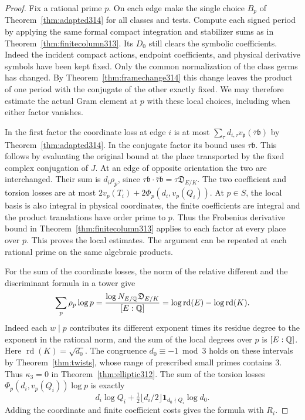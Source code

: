 \documentclass[a4paper,11pt]{article}
\theoremstyle{definition}
\theoremstyle{remark}
\numberwithin{equation}{section}
\begin{document}
\begin{proof}
Fix a rational prime \(p\). On each edge make the single choice
\(B_p\) of Theorem~\ref{thm:adapted314} for all classes and
tests. Compute each signed period by applying the same formal
compact integration and stabilizer sums as in
Theorem~\ref{thm:finitecolumn313}. Its \(D_0\) still clears
the symbolic coefficients. Indeed the incident compact actions,
endpoint coefficients, and physical derivative symbols have been
kept fixed. Only the common normalization of the class germs
has changed. By Theorem~\ref{thm:framechange314} this change
leaves the product of one period with the conjugate of the other
exactly fixed. We may therefore estimate the actual Gram element
at \(p\) with these local choices, including when either factor
vanishes.

In the first factor the coordinate loss at edge \(i\) is at most
\(\sum_\tau d_{i,\tau}v_{\mathfrak p}(\bar\tau\mathfrak b)\)
by Theorem~\ref{thm:adapted314}. In the conjugate factor its
bound uses \(\tau\mathfrak b\). This follows by evaluating the
original bound at the place transported by the fixed complex
conjugation of \(J\). At an edge of opposite orientation the
two are interchanged. Their sum is \(d_i\rho_p\), since
\(\tau\mathfrak b\cdot\bar\tau\mathfrak b=
\tau\mathfrak D_{E/K}\). The two coefficient and torsion losses
are at most \(2v_p(T_i)+2\Phi_p(d_i,v_p(Q_i))\).
At \(p\in S\), the local basis is also integral in physical
coordinates, the finite coefficients are integral and the
product translations have order prime to \(p\). Thus the
Frobenius derivative bound in Theorem~\ref{thm:finitecolumn313}
applies to each factor at every place over \(p\). This proves
the local estimates. The argument can be repeated at each
rational prime on the same algebraic products.

For the sum of the coordinate losses, the norm of the relative
different and the discriminant formula in a tower give
\[
 \sum_p\rho_p\log p=
 \frac{\log N_{E/\mathbb Q}\mathfrak D_{E/K}}{[E:\mathbb Q]}
       =\log\operatorname{rd}(E)-\log\operatorname{rd}(K).
\]
Indeed each \(w\mid p\) contributes its different exponent times
its residue degree to the exponent in the rational norm, and the
sum of the local degrees over \(p\) is \([E:\mathbb Q]\).
Here \(\operatorname{rd}(K)=\sqrt{d_0}\). The congruence
\(d_0\equiv-1\bmod3\) holds on these intervals by
Theorem~\ref{thm:twists}, whose range of prescribed small primes
contains \(3\). Thus \(\kappa_3=0\) in
Theorem~\ref{thm:elliptic312}. The sum of the torsion losses
\(\Phi_p(d_i,v_p(Q_i))\log p\) is exactly
\[
 d_i\log Q_i+\tfrac12\lfloor d_i/2\rfloor
                          \mathbf1_{d_0\nmid Q_i}\log d_0 .
\]
Adding the coordinate and finite coefficient costs gives the
formula with \(R_i\).


\end{proof}
\end{document}
